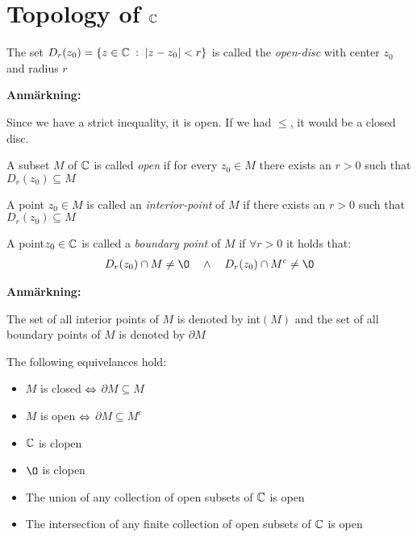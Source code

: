\section{Topology of $\mathbb{C}$}
\par\bigskip
\begin{theo}{}
  The set $D_r(z_0) = \left\{z\in\mathbb{C}\;:\;\left|z-z_0\right|<r\right\}$ is called the \textit{open-disc} with center $z_0$ and radius $r$
\end{theo}
\par\bigskip
\noindent\textbf{Anmärkning:}\par
\noindent Since we have a strict inequality, it is open. If we had $\leq$, it would be a closed disc.
\par\bigskip
\begin{theo}{}
  A subset $M$ of $\mathbb{C}$ is called \textit{open} if for every $z_0\in M$ there exists an $r>0$ such that $D_r(z_0)\subseteq M$
\end{theo}
\par\bigskip
\begin{theo}{}
  A point $z_0\in M$ is called an \textit{interior-point} of $M$ if there exists an $r>0$ such that $D_r(z_0)\subseteq M$
\end{theo}
\par\bigskip
\begin{theo}{}
  A point$z_0\in\mathbb{C}$ is called a \textit{boundary point} of $M$ if $\forall r>0$ it holds that:
  \begin{equation*}
    \begin{gathered}
      D_r(z_0)\cap M\neq\O\quad\wedge \quad D_r(z_0)\cap M^c\neq\O
    \end{gathered}
  \end{equation*}
\end{theo}
\par\bigskip
\noindent\textbf{Anmärkning:}\par
\noindent The set of all interior points of $M$ is denoted by int$(M)$ and the set of all boundary points of $M$  is denoted by $\partial M$
\par\bigskip
\noindent The following equivelances hold:\par
\begin{itemize}
  \item $M$ is closed $\Leftrightarrow$ $\partial M\subseteq M$
  \item $M$ is open $\Leftrightarrow$ $\partial M\subseteq M^c$
  \item $\mathbb{C}$ is clopen
  \item $\O$ is clopen
  \item The union of any collection of open subsets of $\mathbb{C}$ is open
  \item The intersection of any finite collection of open subsets of $\mathbb{C}$ is open
\end{itemize}
